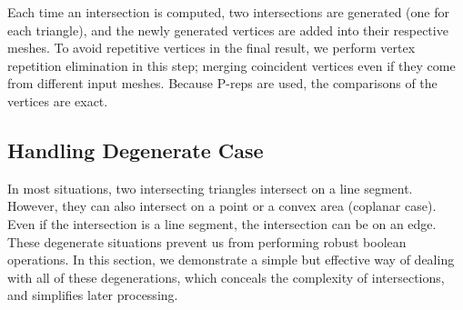 
Each time an intersection is computed, two intersections are generated (one for each triangle), and the newly generated vertices are added into their respective meshes. To avoid repetitive vertices in the final result, we perform vertex repetition elimination in this step; merging coincident vertices even if they come from different input meshes. Because P-reps are used, the comparisons of the vertices are exact.



\subsection{Handling Degenerate Case }
\label{sec:degenerate}


In most situations, two intersecting triangles intersect on a line segment. However, they can also intersect on a point or a convex area (coplanar case). Even if the intersection is a line segment, the intersection can be on an edge. These degenerate situations prevent us from performing robust boolean operations. In this section, we demonstrate a simple but effective way of dealing with all of these degenerations, which conceals the complexity of intersections, and simplifies later processing.



